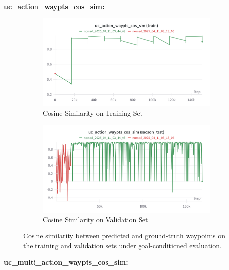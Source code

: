 \documentclass[12pt]{article}
\begin{document}
\newpage
\noindent \textbf{uc\_action\_waypts\_cos\_sim:}\\
\begin{figure}[H]
    \centering
    \begin{subfigure}[b]{0.48\textwidth}
        \centering
        \includegraphics[width=\textwidth]{images/uc_action_sim_train(1).png}
        \caption{Cosine Similarity on Training Set}
        \label{fig:uc_action_waypts_cos_sim_train}
    \end{subfigure}
    \hfill
    \begin{subfigure}[b]{0.48\textwidth}
        \centering
        \includegraphics[width=\textwidth]{images/uc_action_sim_test.png}
        \caption{Cosine Similarity on Validation Set}
        \label{fig:uc_action_waypts_cos_sim_val}
    \end{subfigure}
    \caption{Cosine similarity between predicted and ground-truth waypoints on the training and validation sets under goal-conditioned evaluation.}
\end{figure}
\noindent \textbf{uc\_multi\_action\_waypts\_cos\_sim:}\\
\end{document}
